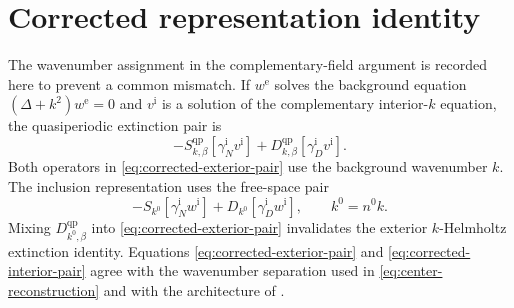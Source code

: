 \section{Corrected representation identity}
\label{app:corrected-identity}

The wavenumber assignment in the complementary-field argument is recorded
here to prevent a common mismatch.  If $w^{\mathrm e}$ solves the background
equation $(\Delta+k^2)w^{\mathrm e}=0$ and $v^{\mathrm i}$ is a solution of
the complementary interior-$k$ equation, the quasiperiodic extinction pair is
\begin{equation}
  -S^{\mathrm{qp}}_{k,\beta}
  [\gamma_N^{\mathrm i}v^{\mathrm i}]
  +D^{\mathrm{qp}}_{k,\beta}
  [\gamma_D^{\mathrm i}v^{\mathrm i}].
  \label{eq:corrected-exterior-pair}
\end{equation}
Both operators in \eqref{eq:corrected-exterior-pair} use the background
wavenumber $k$.  The inclusion representation uses the free-space pair
\begin{equation}
  -S_{k^0}[\gamma_N^{\mathrm i}w^{\mathrm i}]
  +D_{k^0}[\gamma_D^{\mathrm i}w^{\mathrm i}],
  \qquad k^0=n^0k.
  \label{eq:corrected-interior-pair}
\end{equation}
Mixing $D^{\mathrm{qp}}_{k^0,\beta}$ into
\eqref{eq:corrected-exterior-pair} invalidates the exterior $k$-Helmholtz
extinction identity.  Equations \eqref{eq:corrected-exterior-pair} and
\eqref{eq:corrected-interior-pair} agree with the wavenumber separation used
in \eqref{eq:center-reconstruction} and with the architecture of
\cite[Appendix~A]{BarnettGreengard2010}.
